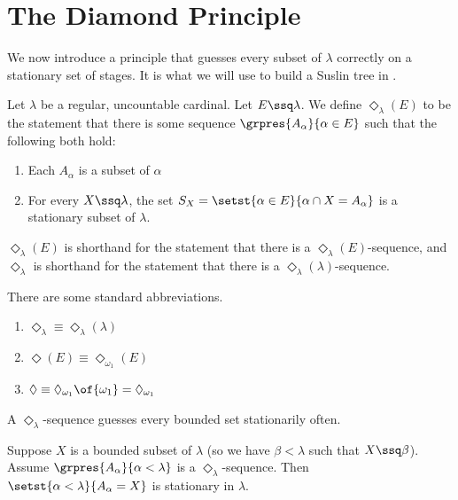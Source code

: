 \section{The Diamond Principle}

We now introduce a principle that guesses every subset of $\lambda$ correctly on a stationary set of stages. It is what we will use to build a Suslin tree in .

\begin{boxdefinition}[$\Diamond$]
    Let $\lambda$ be a regular, uncountable cardinal. Let $E \ssq \lambda$. We define \textbf{$\Diamond_{\lambda}(E)$} to be the statement that there is some sequence $\grpres{A_{\alpha}}{\alpha \in E}$ such that the following both hold:
    \begin{enumerate}
        \item Each $A_{\alpha}$ is a subset of $\alpha$
        \item For every $X \ssq \lambda$, the set $S_X = \setst{\alpha \in E}{\alpha \cap X = A_{\alpha}}$ is a stationary subset of $\lambda$.
    \end{enumerate}
    $\Diamond_{\lambda}(E)$ is shorthand for the statement that there is a $\Diamond_{\lambda}(E)$-sequence, and $\Diamond_{\lambda}$ is shorthand for the statement that there is a $\Diamond_{\lambda}(\lambda)$-sequence.
\end{boxdefinition}

There are some standard abbreviations.

\begin{boxnotation}\hfill
    \begin{enumerate}
        \item $\Diamond_{\lambda} \equiv \Diamond_{\lambda}(\lambda)$
        \item $\Diamond(E) \equiv  \Diamond_{\omega_1}(E)$
        \item $\Diamond \equiv \Diamond_{\omega_1}\of{\omega_1} = \Diamond_{\omega_1}$
    \end{enumerate}
\end{boxnotation}

A $\Diamond_{\lambda}$-sequence guesses every bounded set stationarily often.

\begin{boxlemma}
    Suppose $X$ is a bounded subset of $\lambda$ (so we have $\beta < \lambda$ such that $X \ssq \beta$). Assume $\grpres{A_{\alpha}}{\alpha < \lambda}$ is a $\Diamond_{\lambda}$-sequence. Then $\setst{\alpha < \lambda}{A_{\alpha} = X}$ is stationary in $\lambda$.
\end{boxlemma}

